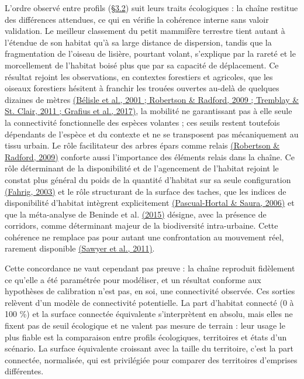 \documentclass[a4paper,11pt]{report}
\begin{document}
L'ordre observé entre profils (\hyperref[sec:3.2]{§3.2}) suit leurs traits écologiques : la chaîne restitue des différences attendues, ce qui en vérifie la cohérence interne sans valoir validation. Le meilleur classement du petit mammifère terrestre tient autant à l'étendue de son habitat qu'à sa large distance de dispersion, tandis que la fragmentation de l'oiseau de lisière, pourtant volant, s'explique par la rareté et le morcellement de l'habitat boisé plus que par sa capacité de déplacement. Ce résultat rejoint les observations, en contextes forestiers et agricoles, que les oiseaux forestiers hésitent à franchir les trouées ouvertes au-delà de quelques dizaines de mètres \hyperref[sec:bibliographie]{(Bélisle et al., 2001 ; Robertson \& Radford, 2009 ; Tremblay \& St. Clair, 2011 ; Grafius et al., 2017)}, la mobilité ne garantissant pas à elle seule la connectivité fonctionnelle des espèces volantes ; ces seuils restent toutefois dépendants de l'espèce et du contexte et ne se transposent pas mécaniquement au tissu urbain. Le rôle facilitateur des arbres épars comme relais \hyperref[sec:bibliographie]{(Robertson \& Radford, 2009)} conforte aussi l'importance des éléments relais dans la chaîne. Ce rôle déterminant de la disponibilité et de l'agencement de l'habitat rejoint le constat plus général du poids de la quantité d'habitat sur sa seule configuration \hyperref[sec:bibliographie]{(Fahrig, 2003)} et le rôle structurant de la surface des taches, que les indices de disponibilité d'habitat intègrent explicitement \hyperref[sec:bibliographie]{(Pascual-Hortal \& Saura, 2006)} et que la méta-analyse de Beninde et al. \hyperref[sec:bibliographie]{(2015)} désigne, avec la présence de corridors, comme déterminant majeur de la biodiversité intra-urbaine. Cette cohérence ne remplace pas pour autant une confrontation au mouvement réel, rarement disponible \hyperref[sec:bibliographie]{(Sawyer et al., 2011)}.

Cette concordance ne vaut cependant pas preuve : la chaîne reproduit fidèlement ce qu'elle a été paramétrée pour modéliser, et un résultat conforme aux hypothèses de calibration n'est pas, en soi, une connectivité observée. Ces sorties relèvent d'un modèle de connectivité potentielle. La part d'habitat connecté (0 à 100 \%) et la surface connectée équivalente s'interprètent en absolu, mais elles ne fixent pas de seuil écologique et ne valent pas mesure de terrain : leur usage le plus fiable est la comparaison entre profils écologiques, territoires et états d'un scénario. La surface équivalente croissant avec la taille du territoire, c'est la part connectée, normalisée, qui est privilégiée pour comparer des territoires d'emprises différentes.
\end{document}

